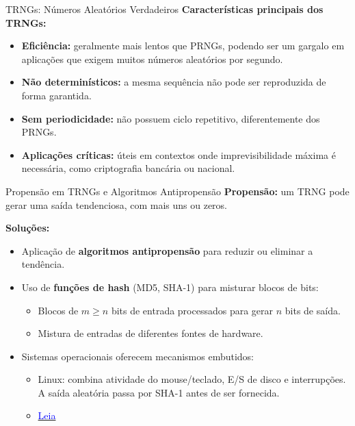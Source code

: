 \begin{frame}{TRNGs: Números Aleatórios Verdadeiros}
    \textbf{Características principais dos TRNGs:}

    \begin{itemize}
        \item \textbf{Eficiência:} geralmente mais lentos que PRNGs, podendo ser um gargalo em aplicações que exigem muitos números aleatórios por segundo.
        \item \textbf{Não determinísticos:} a mesma sequência não pode ser reproduzida de forma garantida.
        \item \textbf{Sem periodicidade:} não possuem ciclo repetitivo, diferentemente dos PRNGs.
        \item \textbf{Aplicações críticas:} úteis em contextos onde imprevisibilidade máxima é necessária, como criptografia bancária ou nacional.
    \end{itemize}

\end{frame}

\begin{frame}{Propensão em TRNGs e Algoritmos Antipropensão}
    \textbf{Propensão:} um TRNG pode gerar uma saída tendenciosa, com mais uns ou zeros.

    \textbf{Soluções:}
    \begin{itemize}
        \item Aplicação de \textbf{algoritmos antipropensão} para reduzir ou eliminar a tendência.
        \item Uso de \textbf{funções de hash} (MD5, SHA-1) para misturar blocos de bits:
              \begin{itemize}
                  \item Blocos de $m \ge n$ bits de entrada processados para gerar $n$ bits de saída.
                  \item Mistura de entradas de diferentes fontes de hardware.
              \end{itemize}
        \item Sistemas operacionais oferecem mecanismos embutidos:
              \begin{itemize}
                  \item Linux: combina atividade do mouse/teclado, E/S de disco e interrupções. A saída aleatória passa por SHA-1 antes de ser fornecida.

                  \item \href{https://man.archlinux.org/man/urandom.4.en}{\textcolor{blue}{Leia}}
              \end{itemize}
    \end{itemize}

\end{frame}

